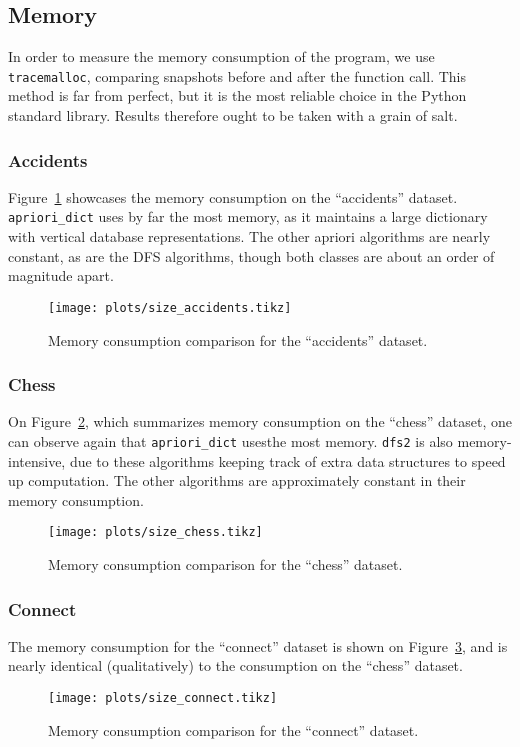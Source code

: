 \documentclass[journal, 9pt]{IEEEtran}
\theoremstyle{definition}
\newcommand{\py}[1]{\texttt{#1}}
\begin{document}
\subsection{Memory}
In order to measure the memory consumption of the program, we use \py{tracemalloc}, comparing snapshots before and after the function call.
This method is far from perfect, but it is the most reliable choice in the Python standard library.
Results therefore ought to be taken with a grain of salt.

\subsubsection{Accidents}
Figure~\ref{fig:size_accidents} showcases the memory consumption on the ``accidents'' dataset.
\py{apriori_dict} uses by far the most memory, as it maintains a large dictionary with vertical database representations.
The other apriori algorithms are nearly constant, as are the DFS algorithms, though both classes are about an order of magnitude apart.
\begin{figure}[!hbtp]
	\centering
	\texttt{[image: plots/size\_accidents.tikz]}
	\caption{Memory consumption comparison for the ``accidents'' dataset.}
	\label{fig:size_accidents}
\end{figure}

\subsubsection{Chess}
On Figure~\ref{fig:size_chess}, which summarizes memory consumption on the ``chess'' dataset, one can observe again that \py{apriori_dict} usesthe most memory.
\py{dfs2} is also memory-intensive, due to these algorithms keeping track of extra data structures to speed up computation.
The other algorithms are approximately constant in their memory consumption.
\begin{figure}[!hbtp]
	\centering
	\texttt{[image: plots/size\_chess.tikz]}
	\caption{Memory consumption comparison for the ``chess'' dataset.}
	\label{fig:size_chess}
\end{figure}

\subsubsection{Connect}
The memory consumption for the ``connect'' dataset is shown on Figure~\ref{fig:size_connect}, and is nearly identical (qualitatively) to the consumption on the ``chess'' dataset.
\begin{figure}[!hbtp]
	\centering
	\texttt{[image: plots/size\_connect.tikz]}
	\caption{Memory consumption comparison for the ``connect'' dataset.}
	\label{fig:size_connect}
\end{figure}
\end{document}
